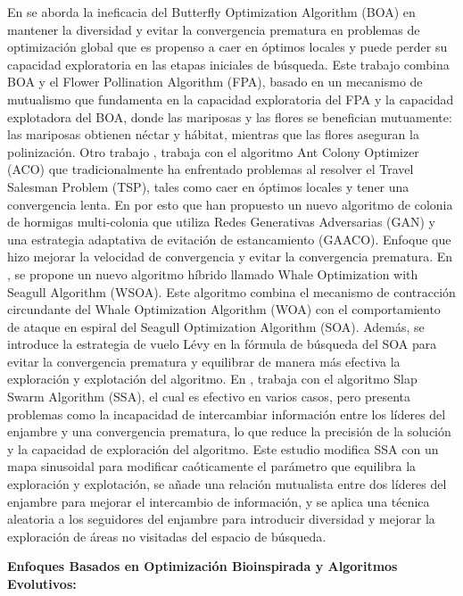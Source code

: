 En \cite{wang2021hybrid} se aborda la ineficacia del Butterfly Optimization Algorithm (BOA) en mantener la diversidad y evitar la convergencia prematura en problemas de optimización global que es propenso a caer en óptimos locales y puede perder su capacidad exploratoria en las etapas iniciales de búsqueda. Este trabajo combina BOA y el Flower Pollination Algorithm (FPA), basado en un mecanismo de mutualismo que fundamenta en la capacidad exploratoria del FPA y la capacidad explotadora del BOA, donde las mariposas y las flores se benefician mutuamente: las mariposas obtienen néctar y hábitat, mientras que las flores aseguran la polinización. Otro trabajo \cite{8962051}, trabaja con el algoritmo Ant Colony Optimizer (ACO) que tradicionalmente ha enfrentado problemas al resolver el Travel Salesman Problem (TSP), tales como caer en óptimos locales y tener una convergencia lenta. En por esto que han propuesto un nuevo algoritmo de colonia de hormigas multi-colonia que utiliza Redes Generativas Adversarias (GAN) y una estrategia adaptativa de evitación de estancamiento (GAACO). Enfoque que hizo mejorar la velocidad de convergencia y evitar la convergencia prematura. En \cite{a_hybrid_WOA_seagullAlgorithm}, se propone un nuevo algoritmo híbrido llamado Whale Optimization with Seagull Algorithm (WSOA). Este algoritmo combina el mecanismo de contracción circundante del Whale Optimization Algorithm (WOA) con el comportamiento de ataque en espiral del Seagull Optimization Algorithm (SOA). Además, se introduce la estrategia de vuelo Lévy en la fórmula de búsqueda del SOA para evitar la convergencia prematura y equilibrar de manera más efectiva la exploración y explotación del algoritmo. En \cite{ccelik2021advancement}, trabaja con el algoritmo Slap Swarm Algorithm (SSA), el cual es efectivo en varios casos, pero presenta problemas como la incapacidad de intercambiar información entre los líderes del enjambre y una convergencia prematura, lo que reduce la precisión de la solución y la capacidad de exploración del algoritmo. Este estudio modifica SSA con un mapa sinusoidal para modificar caóticamente el parámetro que equilibra la exploración y explotación, se añade una relación mutualista entre dos líderes del enjambre para mejorar el intercambio de información, y se aplica una técnica aleatoria a los seguidores del enjambre para introducir diversidad y mejorar la exploración de áreas no visitadas del espacio de búsqueda.

\textbf{Enfoques Basados en Optimización Bioinspirada y Algoritmos Evolutivos:}

